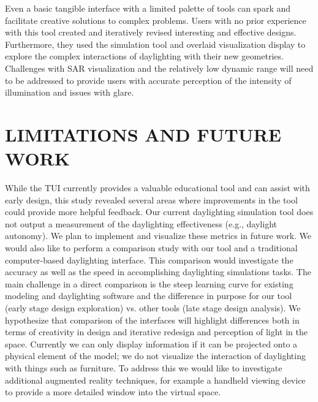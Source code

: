 \documentclass[preprint]{elsarticle}
\begin{document}
Even a basic tangible interface with a limited palette of tools can
spark and facilitate creative solutions to complex problems.  Users
with no prior experience with this tool created and iteratively
revised interesting and effective designs.  Furthermore, they used the
simulation tool and overlaid visualization display to explore the
complex interactions of daylighting with their new geometries.
Challenges with SAR visualization and the relatively low dynamic range
will need to be addressed to provide users with accurate perception of
the intensity of illumination and issues with glare.


%










\section{LIMITATIONS AND FUTURE WORK}

While the TUI currently provides a valuable educational tool and 
can assist with early design, this study revealed several areas where
improvements in the tool could provide more helpful feedback.
Our current daylighting simulation tool does not output a measurement
of the daylighting effectiveness (e.g., daylight autonomy).
We plan to implement and visualize these metrics in future work.  We
would also like to perform a comparison study with our tool and a
traditional computer-based daylighting interface.  This comparison
would investigate the accuracy as well as the speed in accomplishing
daylighting simulations tasks.  The main challenge in a direct
comparison is the steep learning curve for existing modeling and
daylighting software and the difference in purpose for our tool (early
stage design exploration) vs. other tools (late stage design
analysis).  We hypothesize that comparison of the interfaces will
highlight differences both in terms of creativity in design and
iterative redesign and perception of light in the space.
%
Currently we can only display information if it can be projected onto
a physical element of the model; we do not visualize the interaction
of daylighting with things such as furniture.
%
To address this we would like to investigate additional augmented
reality techniques, for example a handheld viewing
device~\cite{Ishii97tangiblebits,642613,1517704} to provide a more
detailed window into the virtual space.
\end{document}
